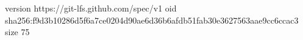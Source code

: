 version https://git-lfs.github.com/spec/v1
oid sha256:f9d3b10286d5f6a7ce0204d90ae6d36b6afdb51fab30e3627563aae9cc6ccac3
size 75

